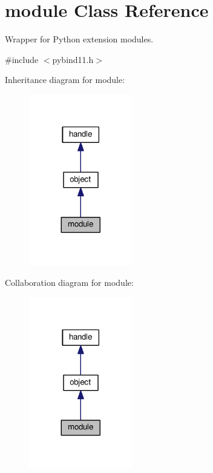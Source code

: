 \hypertarget{classmodule}{}\section{module Class Reference}
\label{classmodule}


Wrapper for Python extension modules.  




{\ttfamily \#include $<$pybind11.\+h$>$}



Inheritance diagram for module\+:
\nopagebreak
\begin{figure}[H]
\begin{center}
\leavevmode
\includegraphics[width=128pt]{classmodule__inherit__graph}
\end{center}
\end{figure}


Collaboration diagram for module\+:
\nopagebreak
\begin{figure}[H]
\begin{center}
\leavevmode
\includegraphics[width=128pt]{classmodule__coll__graph}
\end{center}
\end{figure}
